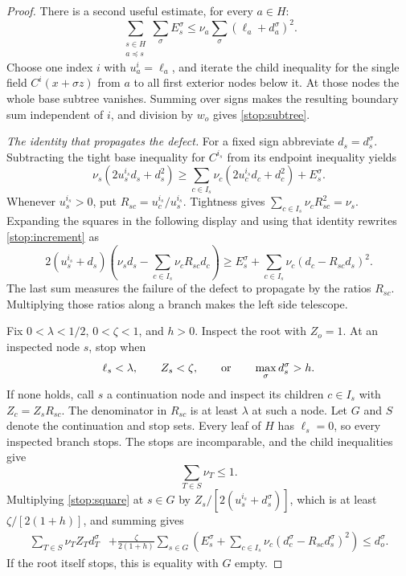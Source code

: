 \begin{proof}
There is a second useful estimate, for every $a\in H$:
\begin{equation}\label{stop:subtree}
 \sum_{\substack{s\in H\\a\preceq s}}\sum_\sigma E_s^\sigma
 \le\nu_a\sum_\sigma(\ell_a+d_a^\sigma)^2.
\end{equation}
Choose one index $i$ with $u_a^i=\ell_a$, and iterate the child inequality
for the single field $C^i(x+\sigma z)$ from $a$ to all first exterior
nodes below it.  At those nodes the whole base subtree vanishes.
Summing over signs makes the resulting boundary sum independent of
$i$, and division by $w_o$ gives \eqref{stop:subtree}.

\medskip
\noindent\emph{The identity that propagates the defect.}
For a fixed sign abbreviate $d_s=d_s^\sigma$.  Subtracting the tight
base inequality for $C^{i_s}$ from its endpoint inequality yields
\begin{equation}\label{stop:increment}
 \nu_s(2u_s^{i_s}d_s+d_s^2)
 \ge\sum_{c\in I_s}\nu_c(2u_c^{i_s}d_c+d_c^2)+E_s^\sigma.
\end{equation}
Whenever $u_s^{i_s}>0$, put $R_{sc}=u_c^{i_s}/u_s^{i_s}$.
Tightness gives $\sum_{c\in I_s}\nu_cR_{sc}^2=\nu_s$.
Expanding the squares in the following display and using that identity
rewrites \eqref{stop:increment} as
\begin{equation}\label{stop:square}
 2(u_s^{i_s}+d_s)
 \left(\nu_sd_s-\sum_{c\in I_s}\nu_cR_{sc}d_c\right)
 \ge E_s^\sigma+
       \sum_{c\in I_s}\nu_c(d_c-R_{sc}d_s)^2.
\end{equation}
The last sum measures the failure of the defect to propagate by the
ratios $R_{sc}$.  Multiplying those ratios along a branch makes the
left side telescope.

Fix $0<\lambda<1/2$, $0<\zeta<1$, and $h>0$.  Inspect the root with
$Z_o=1$.  At an inspected node $s$, stop when
\begin{equation}\label{stop:rule}
 \ell_s<\lambda,\qquad Z_s<\zeta,
 \qquad\hbox{or}\qquad\max_\sigma d_s^\sigma>h.
\end{equation}
If none holds, call $s$ a continuation node and inspect its children
$c\in I_s$ with $Z_c=Z_sR_{sc}$.  The denominator in $R_{sc}$ is at
least $\lambda$ at such a node.  Let $G$ and $S$ denote the continuation
and stop sets.  Every leaf of $H$ has $\ell_s=0$, so every inspected
branch stops.  The stops are incomparable, and the child inequalities
give
\begin{equation}\label{stop:mass}
 \sum_{T\in S}\nu_T\le1.
\end{equation}
Multiplying \eqref{stop:square} at $s\in G$ by
$Z_s/[2(u_s^{i_s}+d_s^\sigma)]$, which is at least
$\zeta/[2(1+h)]$, and summing gives
\begin{equation}\label{stop:telescope}
 \begin{split}
 \sum_{T\in S}\nu_TZ_Td_T^\sigma
 &+\frac{\zeta}{2(1+h)}\sum_{s\in G}
 \left(E_s^\sigma+\sum_{c\in I_s}
        \nu_c(d_c^\sigma-R_{sc}d_s^\sigma)^2\right)
 \le d_o^\sigma.
 \end{split}
\end{equation}
If the root itself stops, this is equality with $G$ empty.


\end{proof}
